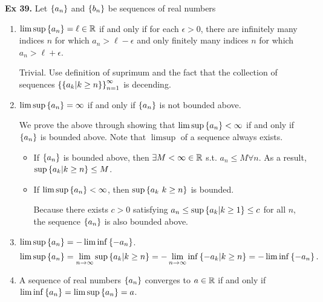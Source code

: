 \noindent \textbf{Ex 39.} \label{ex:39}
Let $\left\{a_n\right\}$ and $\left\{b_n\right\}$ be sequences of real numbers
\begin{enumerate}[label=(\roman*)]
    \item $\limsup\left\{a_n\right\} = \ell \in \mathbb{R}$ if and only if for each $\epsilon > 0$, there are infinitely many indices $n$ for which $a_n > \ell - \epsilon$ and only finitely many indices $n$ for which $a_n > \ell + \epsilon$.
    
    Trivial. Use definition of suprimum and the fact that the collection of sequences $\left\{\left\{a_k | k \geq n\right\}\right\}_{n=1}^\infty$ is decending.

    \item $\limsup\left\{a_n\right\} = \infty$ if and only if $\left\{a_n\right\}$ is not bounded above.
    
    We prove the above through showing that $\limsup\left\{a_n\right\} < \infty$ if and only if $\left\{a_n\right\}$ is bounded above. Note that $\limsup$ of a sequence always exists.
    \begin{itemize}
        \item If $\left\{a_n\right\}$ is bounded above, then $\exists M < \infty \in \mathbb{R}$ s.t. $a_n \leq M \forall n$.
        As a result, $\sup\left\{a_k | k \geq n\right\} \leq M$.
        \item If $\limsup\left\{a_n\right\} < \infty$, then $\sup\left\{a_k \ k \geq n\right\}$ is bounded.
        
        Because there exists $c > 0$ satisfying $a_n \leq \sup\left\{a_k | k \geq 1\right\} \leq c$ for all $n$, the sequence $\left\{a_n\right\}$ is also bounded above.
    \end{itemize}

    \item $\limsup\left\{a_n\right\} = -\liminf\left\{-a_n\right\}$.
    \[\limsup\left\{a_n\right\} = \lim_{n\to\infty}\sup\left\{a_k | k \geq n\right\} = -\lim_{n\to\infty}\inf\left\{-a_k | k \geq n\right\} = -\liminf\left\{-a_n\right\}.\]

    \item A sequence of real numbers $\left\{a_n\right\}$ converges to $a \in \mathbb{R}$ if and only if $\liminf\left\{a_n\right\} = \limsup\left\{a_n\right\} = a$.
    

\end{enumerate}
